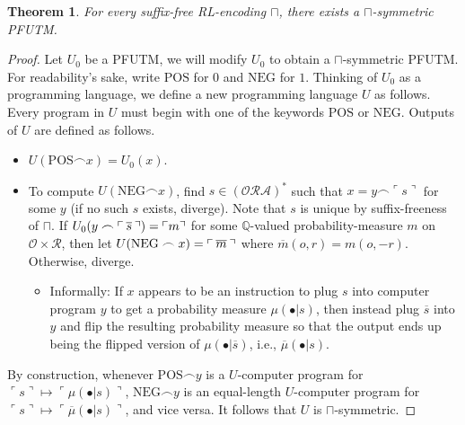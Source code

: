 \documentclass{article}
\newtheorem{theorem}{Theorem}
\begin{document}
\begin{theorem}
\label{envirosymmetricexistencelemma}
    For every suffix-free RL-encoding $\sqcap$,
    there exists a $\sqcap$-symmetric PFUTM.
\end{theorem}

\begin{proof}
    Let $U_0$ be a PFUTM, we will modify $U_0$ to obtain a $\sqcap$-symmetric PFUTM.
    For readability's sake, write $\mathrm{POS}$ for $0$ and $\mathrm{NEG}$ for $1$.
    Thinking of $U_0$ as a programming language, we define a new programming language
    $U$ as follows. Every program in $U$ must begin with one of the keywords
    $\mathrm{POS}$ or $\mathrm{NEG}$. Outputs of $U$ are defined as follows.
    \begin{itemize}
        \item $U(\mathrm{POS}\frown x)=U_0(x)$.
        \item To compute $U(\mathrm{NEG}\frown x)$, find
        $s\in (\mathcal O \mathcal R\mathcal A)^*$ such that
        $x=y\frown \ulcorner s\urcorner$ for some $y$ (if no such $s$ exists, diverge).
        Note that $s$ is unique by suffix-freeness of $\sqcap$.
        If $
            U_0(y\frown
            \ulcorner \hspace{.2em} \overline s\hspace{.2em}\urcorner)
            =\ulcorner m\urcorner
        $
        for some $\mathbb Q$-valued probability-measure $m$ on
        $\mathcal O\times\mathcal R$, then let
        $U(\mathrm{NEG}\frown x)=\ulcorner\hspace{.2em} \overline m\hspace{.2em}\urcorner$
        where $\overline m(o,r)=m(o,-r)$.
        Otherwise, diverge.
        \begin{itemize}
            \item Informally:
            If $x$ appears to be an instruction to plug $s$ into computer
            program $y$ to get a probability measure $\mu(\bullet|s)$, then
            instead plug $\overline s$ into $y$ and flip the resulting
            probability measure so that the output
            ends up being the flipped version of $\mu(\bullet|\overline s)$,
            i.e., $\overline \mu(\bullet|s)$.
        \end{itemize}
    \end{itemize}
    By construction, whenever $\mathrm{POS}\frown y$ is a $U$-computer program
    for $\ulcorner s\urcorner\mapsto \ulcorner \mu(\bullet|s)\urcorner$,
    $\mathrm{NEG}\frown y$ is an equal-length $U$-computer program
    for $\ulcorner s\urcorner\mapsto \ulcorner \overline\mu(\bullet|s)\urcorner$,
    and vice versa.
    It follows that $U$ is $\sqcap$-symmetric.
\end{proof}
\end{document}
